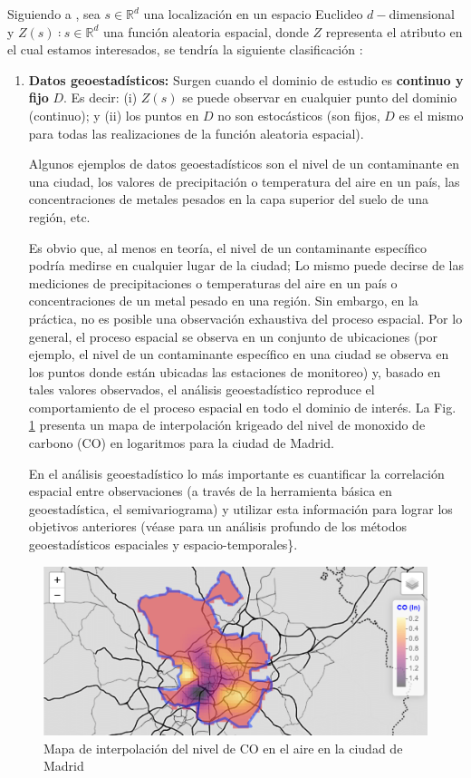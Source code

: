 \documentclass[
]{book}
\theoremstyle{definition}
\theoremstyle{definition}
\theoremstyle{definition}
\theoremstyle{definition}
\theoremstyle{remark}
\begin{document}
Siguiendo a \citet{cressie1993}, sea \(s ∈ ℝ^d\) una localización en un espacio Euclideo
\(d-\)dimensional y \({Z(s)∶ s ∈ ℝ^d}\) una función aleatoria espacial, donde \(Z\)
representa el atributo en el cual estamos interesados, se tendría la siguiente
clasificación \citep{montero_et_al_2015}:

\begin{enumerate}
\def\labelenumi{\arabic{enumi}.}
\item
  \textbf{Datos geoestadísticos:} Surgen cuando el dominio de estudio es \textbf{continuo
  y fijo} \(D\). Es decir: (i) \(Z(s)\) se puede observar en cualquier punto del
  dominio (continuo); y (ii) los puntos en \(D\) no son estocásticos (son fijos,
  \(D\) es el mismo para todas las realizaciones de la función aleatoria
  espacial).

  Algunos ejemplos de datos geoestadísticos son el nivel de un contaminante en
  una ciudad, los valores de precipitación o temperatura del aire en un país,
  las concentraciones de metales pesados en la capa superior del suelo de una
  región, etc.

  Es obvio que, al menos en teoría, el nivel de un contaminante específico
  podría medirse en cualquier lugar de la ciudad; Lo mismo puede decirse de
  las mediciones de precipitaciones o temperaturas del aire en un país o
  concentraciones de un metal pesado en una región. Sin embargo, en la
  práctica, no es posible una observación exhaustiva del proceso espacial. Por
  lo general, el proceso espacial se observa en un conjunto de ubicaciones
  (por ejemplo, el nivel de un contaminante específico en una ciudad se
  observa en los puntos donde están ubicadas las estaciones de monitoreo) y,
  basado en tales valores observados, el análisis geoestadístico reproduce el
  comportamiento de el proceso espacial en todo el dominio de interés. La Fig.
  \ref{fig:ejem-geo} presenta un mapa de interpolación krigeado del nivel de
  monoxido de carbono (CO) en logaritmos para la ciudad de Madrid.

  En el análisis geoestadístico lo más importante es cuantificar la
  correlación espacial entre observaciones (a través de la herramienta básica
  en geoestadística, el semivariograma) y utilizar esta información para
  lograr los objetivos anteriores (véase \citet{montero_et_al_2015} para un análisis
  profundo de los métodos geoestadísticos espaciales y espacio-temporales\}.
\end{enumerate}

\begin{figure}

{\centering \includegraphics[width=0.6\linewidth]{img/log_co_madrid} 

}

\caption{Mapa de interpolación del nivel de CO en el aire en la ciudad de Madrid}\label{fig:ejem-geo}
\end{figure}
\end{document}
